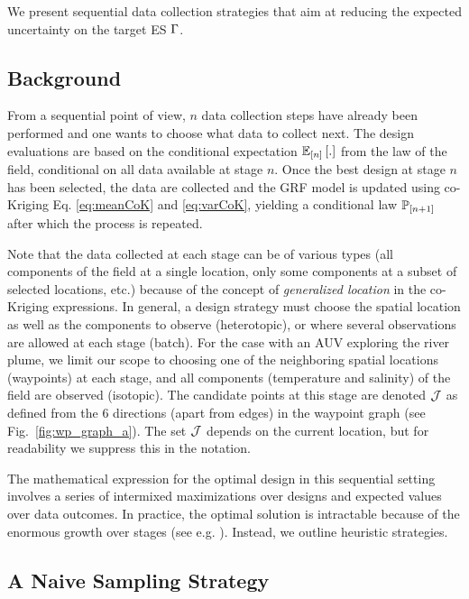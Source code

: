 \documentclass[aoas]{imsart}
\begin{document}
We present sequential data collection
strategies that aim at reducing the expected uncertainty on the target
ES $\Gamma$.

\subsection{Background}

From a sequential point of view, $n$ data collection steps have
already been performed and one wants to choose what data to collect
next. The design evaluations
are based on the conditional expectation $\mathbb{E}_{[n]} \left[.\right]$ from the law
of the field, conditional on all data available at
stage $n$.
Once the best design at stage $n$
has been selected, the data are collected and the GRF
model is updated using co-Kriging
Eq. \ref{eq:meanCoK} and \ref{eq:varCoK}, yielding a conditional law $\mathbb{P}_{[n+1]}$
after which the process is repeated.

Note that the data collected at each stage can be of various
types (all components of the field at a single location, only some
components at a subset of selected locations, etc.) because of the
concept of \textit{generalized location} in the co-Kriging expressions.
In general, a design strategy must choose the spatial location as well
as the components to observe (heterotopic), or where several
observations are allowed at each stage (batch).  For the case with an
AUV exploring the river plume, we limit our scope to choosing one of
the neighboring spatial locations (waypoints) at each stage, and all
components (temperature and salinity) of the field are observed
(isotopic). The candidate points at this stage are denoted
$\mathcal{J}$ as defined from the 6 directions (apart from edges) in
the waypoint graph (see Fig.~\ref{fig:wp_graph_a}). The
set $\mathcal{J}$ depends on the current location, but for readability
we suppress this in the notation.

The mathematical expression for the optimal design in this sequential
setting involves a series of intermixed maximizations over designs and
expected values over data outcomes. In practice, the optimal solution is intractable
because of the enormous growth over stages (see
e.g. \cite{powell2016perspectives}).
Instead, we outline heuristic strategies.


\subsection{A Naive Sampling Strategy}
\label{naive}
\end{document}
